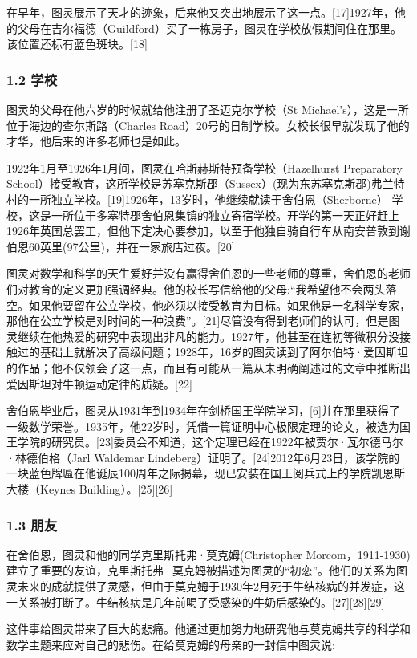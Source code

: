 在早年，图灵展示了天才的迹象，后来他又突出地展示了这一点。[17]1927年，他的父母在吉尔福德（Guildford）买了一栋房子，图灵在学校放假期间住在那里。该位置还标有蓝色斑块。[18]
\subsubsection{1.2 学校}
图灵的父母在他六岁的时候就给他注册了圣迈克尔学校（St Michael's），这是一所位于海边的查尔斯路（Charles Road）20号的日制学校。女校长很早就发现了他的才华，他后来的许多老师也是如此。

1922年1月至1926年1月间，图灵在哈斯赫斯特预备学校（Hazelhurst Preparatory School）接受教育，这所学校是苏塞克斯郡（Sussex）(现为东苏塞克斯郡)弗兰特村的一所独立学校。[19]1926年，13岁时，他继续就读于舍伯恩（Sherborne） 学校，这是一所位于多塞特郡舍伯恩集镇的独立寄宿学校。开学的第一天正好赶上1926年英国总罢工，但他下定决心要参加，以至于他独自骑自行车从南安普敦到谢伯恩60英里(97公里)，并在一家旅店过夜。[20]

图灵对数学和科学的天生爱好并没有赢得舍伯恩的一些老师的尊重，舍伯恩的老师们对教育的定义更加强调经典。他的校长写信给他的父母:“我希望他不会两头落空。如果他要留在公立学校，他必须以接受教育为目标。如果他是一名科学专家，那他在公立学校是对时间的一种浪费”。[21]尽管没有得到老师们的认可，但是图灵继续在他热爱的研究中表现出非凡的能力。1927年，他甚至在连初等微积分没接触过的基础上就解决了高级问题；1928年，16岁的图灵读到了阿尔伯特·爱因斯坦的作品；他不仅领会了这一点，而且有可能从一篇从未明确阐述过的文章中推断出爱因斯坦对牛顿运动定律的质疑。[22]

舍伯恩毕业后，图灵从1931年到1934年在剑桥国王学院学习，[6]并在那里获得了一级数学荣誉。1935年，他22岁时，凭借一篇证明中心极限定理的论文，被选为国王学院的研究员。[23]委员会不知道，这个定理已经在1922年被贾尔·瓦尔德马尔·林德伯格（Jarl Waldemar Lindeberg）证明了。[24]2012年6月23日，该学院的一块蓝色牌匾在他诞辰100周年之际揭幕，现已安装在国王阅兵式上的学院凯恩斯大楼（Keynes Building）。[25][26]
\subsubsection{1.3 朋友}
在舍伯恩，图灵和他的同学克里斯托弗·莫克姆(Christopher Morcom，1911-1930)建立了重要的友谊，克里斯托弗·莫克姆被描述为图灵的“初恋”。他们的关系为图灵未来的成就提供了灵感，但由于莫克姆于1930年2月死于牛结核病的并发症，这一关系被打断了。牛结核病是几年前喝了受感染的牛奶后感染的。[27][28][29]

这件事给图灵带来了巨大的悲痛。他通过更加努力地研究他与莫克姆共享的科学和数学主题来应对自己的悲伤。在给莫克姆的母亲的一封信中图灵说:

